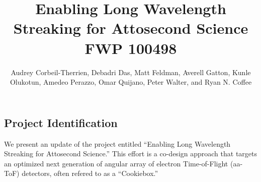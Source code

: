\documentclass[aps]{revtex4}
\begin{document}
\title{Enabling Long Wavelength Streaking for Attosecond Science\\FWP 100498}

\author{Audrey Corbeil-Therrien, Debadri Das, Matt Feldman, Averell Gatton, Kunle Olukotun, Amedeo Perazzo, Omar Quijano, Peter Walter, and Ryan N. Coffee}

\newlength{\figwidth}
\setlength{\figwidth}{.9\linewidth}

\maketitle

\subsection*{Project Identification}
We present an update of the project entitled ``Enabling Long Wavelength Streaking for Attosecond Science.''
This effort is a co-design approach that targets an optimized next generation of angular array of electron Time-of-Flight (aa-ToF) detectors, often refered to as a ``Cookiebox.''
\end{document}
